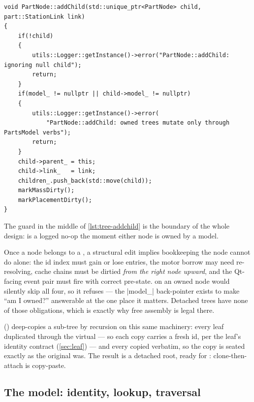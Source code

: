 \begin{listing}[htbp]
\begin{verbatim}
void PartNode::addChild(std::unique_ptr<PartNode> child, part::StationLink link)
{
    if(!child)
    {
        utils::Logger::getInstance()->error("PartNode::addChild: ignoring null child");
        return;
    }
    if(model_ != nullptr || child->model_ != nullptr)
    {
        utils::Logger::getInstance()->error(
            "PartNode::addChild: owned trees mutate only through PartsModel verbs");
        return;
    }
    child->parent_ = this;
    child->link_   = link;
    children_.push_back(std::move(child));
    markMassDirty();
    markPlacementDirty();
}
\end{verbatim}
\caption{Detached-tree assembly and its ownership guard
(--90).}\label{lst:tree-addchild}
\end{listing}

The guard in the middle of \cref{lst:tree-addchild} is the boundary of the whole design:
 is a logged no-op the moment either node is owned by a model.

\begin{designrule}
Once a node belongs to a , a structural edit implies bookkeeping the node cannot
do alone: the id index must gain or lose entries, the motor borrow may need re-resolving, cache
chains must be dirtied \emph{from the right node upward}, and the Qt-facing event pair must fire
with correct pre-state.  on an owned node would silently skip all four, so it
refuses --- the \cppinline|model_| back-pointer exists to make ``am I owned?'' answerable at the
one place it matters. Detached trees have none of those obligations, which is exactly why free
assembly is legal there.
\end{designrule}

 () deep-copies a sub-tree by recursion on this
same machinery: every leaf duplicated through the virtual  --- so each copy
carries a fresh id, per the leaf's identity contract (\cref{sec:leaf}) --- and every
 copied verbatim, so the copy is seated exactly as the original was. The result
is a detached root, ready for : clone-then-attach is copy-paste.

\subsection{The model: identity, lookup, traversal}\label{sec:tree-lookup}


